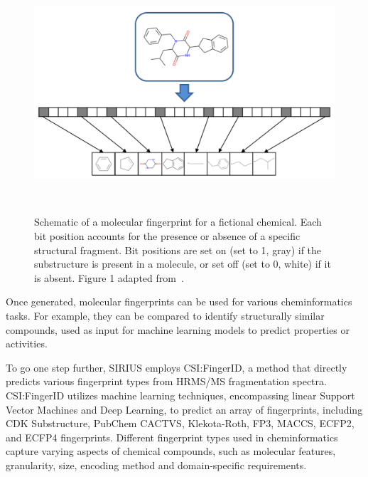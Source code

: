 \begin{figure}
    \centering
    \includegraphics[width=1.0\textwidth]{figures/fingerprint_schema.png}  
    \caption{Schematic of a molecular fingerprint for a fictional chemical. Each bit position accounts for the presence or absence of a specific structural fragment. Bit positions are set on (set to 1, gray) if the substructure is present in a molecule, or set off (set to 0, white) if it is absent. Figure 1 adapted from~\cite{janela2022}.}
~\label{fig:fingerprint_schema} 
\end{figure}

Once generated, molecular fingerprints can be used for various cheminformatics tasks. For example, they can be compared to identify structurally similar compounds, used as input for machine learning models to predict properties or activities.

To go one step further, SIRIUS employs CSI:FingerID, a method that directly predicts various fingerprint types from HRMS/MS fragmentation spectra. CSI:FingerID utilizes machine learning techniques, encompassing linear Support Vector Machines and Deep Learning, to predict an array of fingerprints, including CDK Substructure, PubChem CACTVS, Klekota-Roth, FP3, MACCS, ECFP2, and ECFP4 fingerprints. Different fingerprint types used in cheminformatics capture varying aspects of chemical compounds, such as molecular features, granularity, size, encoding method and domain-specific requirements.

